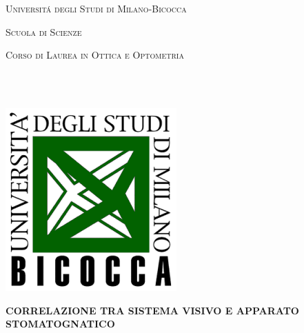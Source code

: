 \documentclass [a4paper,11pt]{book}
\begin{document}
\frontmatter

\newpage
\thispagestyle{empty}
\noindent
\hspace*{-1mm}

\begin{center}
{\LARGE\textsc{Universit\'a degli Studi di Milano-Bicocca}\par}
{\Large\textsc{Scuola di Scienze}\par}
{\Large\textsc{Corso di Laurea in Ottica e Optometria}\par}
\end{center}

\\\
\begin{center}
\includegraphics[scale=1]{source/immagini/logo_bicocca_colorato.png}
\end{center}
\vfill

\begin{center}
{\huge\textsc{\textbf{CORRELAZIONE TRA SISTEMA VISIVO E APPARATO STOMATOGNATICO}}\par}
\end{center}
\vfill
\large
\vskip 1.2cm
\end{document}
